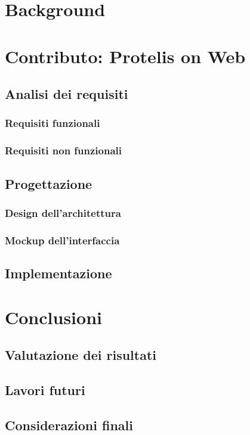 \documentclass[%
  a4paper,                %
  fontsize=12pt,          %
  twoside,                %
  openright,              %
  titlepage,              %
  final                   %
  headings=standardclasses, %
  headings=big,             %
  chapterprefix=false       %
]{scrbook}
\begin{document}
  \frontmatter{}

  
  
  
  

  \tableofcontents

  \mainmatter{}


  \part{Background}
    
    
    

  \part{Contributo: Protelis on Web}
    \chapter{Analisi dei requisiti}
      \section{Requisiti funzionali}
      \section{Requisiti non funzionali}
    \chapter{Progettazione}
      \section{Design dell'architettura}
      \section{Mockup dell'interfaccia}
    \chapter{Implementazione}

  \part{Conclusioni}
    \chapter{Valutazione dei risultati}
    \chapter{Lavori futuri}
    \chapter{Considerazioni finali}

  \appendix
  

  \backmatter{}
  
  
\end{document}
